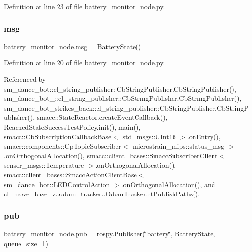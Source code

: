Definition at line 23 of file battery\+\_\+monitor\+\_\+node.\+py.

\mbox{\label{namespacebattery__monitor__node_ab1920c64448816edd4064e494275fdff}} 
\subsubsection{\texorpdfstring{msg}{msg}}
{\footnotesize\ttfamily battery\+\_\+monitor\+\_\+node.\+msg = Battery\+State()}



Definition at line 20 of file battery\+\_\+monitor\+\_\+node.\+py.



Referenced by sm\+\_\+dance\+\_\+bot\+::cl\+\_\+string\+\_\+publisher\+::\+Cb\+String\+Publisher.\+Cb\+String\+Publisher(), sm\+\_\+dance\+\_\+bot\+\_\+::cl\+\_\+string\+\_\+publisher\+::\+Cb\+String\+Publisher.\+Cb\+String\+Publisher(), sm\+\_\+dance\+\_\+bot\+\_\+strikes\+\_\+back\+::cl\+\_\+string\+\_\+publisher\+::\+Cb\+String\+Publisher.\+Cb\+String\+Publisher(), smacc\+::\+State\+Reactor.\+create\+Event\+Callback(), Reached\+State\+Success\+Test\+Policy.\+init(), main(), smacc\+::\+Cb\+Subscription\+Callback\+Base$<$ std\+\_\+msgs\+::\+U\+Int16 $>$.\+on\+Entry(), smacc\+::components\+::\+Cp\+Topic\+Subscriber$<$ microstrain\+\_\+mips\+::status\+\_\+msg $>$.\+on\+Orthogonal\+Allocation(), smacc\+::client\+\_\+bases\+::\+Smacc\+Subscriber\+Client$<$ sensor\+\_\+msgs\+::\+Temperature $>$.\+on\+Orthogonal\+Allocation(), smacc\+::client\+\_\+bases\+::\+Smacc\+Action\+Client\+Base$<$ sm\+\_\+dance\+\_\+bot\+::\+L\+E\+D\+Control\+Action $>$.\+on\+Orthogonal\+Allocation(), and cl\+\_\+move\+\_\+base\+\_\+z\+::odom\+\_\+tracker\+::\+Odom\+Tracker.\+rt\+Publish\+Paths().

\mbox{\label{namespacebattery__monitor__node_ab13957b56951b692f19d70ccac2e2511}} 
\subsubsection{\texorpdfstring{pub}{pub}}
{\footnotesize\ttfamily battery\+\_\+monitor\+\_\+node.\+pub = rospy.\+Publisher(\char`\"{}battery\char`\"{}, Battery\+State, queue\+\_\+size=1)}




